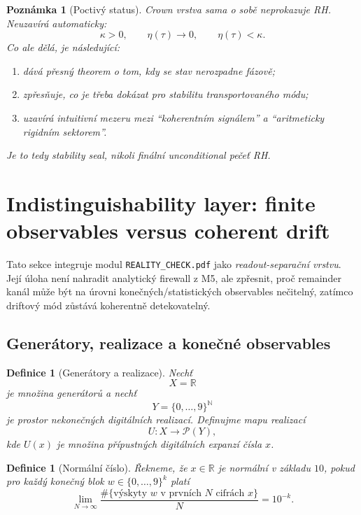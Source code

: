 \documentclass[11pt,a4paper]{article}
\newtheorem{definition}[theorem]{Definice}
\newtheorem{remark}[theorem]{Poznámka}
\begin{document}
\begin{remark}[Poctivý status]
Crown vrstva sama o sobě neprokazuje RH. Neuzavírá automaticky:
\[
\kappa>0,
\qquad
\eta(\tau)\to 0,
\qquad
\eta(\tau)<\kappa.
\]
Co ale dělá, je následující:
\begin{enumerate}
    \item dává přesný theorem o tom, kdy se stav nerozpadne fázově;
    \item zpřesňuje, co je třeba dokázat pro stabilitu transportovaného módu;
    \item uzavírá intuitivní mezeru mezi ``koherentním signálem'' a ``aritmeticky rigidním sektorem''.
\end{enumerate}
Je to tedy \emph{stability seal}, nikoli finální unconditional pečeť RH.
\end{remark}



\section{Indistinguishability layer: finite observables versus coherent drift}

Tato sekce integruje modul \texttt{REALITY\_CHECK.pdf} jako \emph{readout-separační vrstvu}.
Její úloha není nahradit analytický firewall z M5, ale zpřesnit, proč remainder kanál může být
na úrovni konečných/statistických observables nečitelný, zatímco driftový mód zůstává koherentně
detekovatelný.

\subsection*{Generátory, realizace a konečné observables}

\begin{definition}[Generátory a realizace]
Nechť
\[
X=\mathbb{R}
\]
je množina generátorů a nechť
\[
Y=\{0,\dots,9\}^{\mathbb N}
\]
je prostor nekonečných digitálních realizací. Definujme mapu realizací
\[
U:X\to \mathcal P(Y),
\]
kde \(U(x)\) je množina přípustných digitálních expanzí čísla \(x\).
\end{definition}

\begin{definition}[Normální číslo]
Řekneme, že \(x\in\mathbb R\) je normální v základu \(10\), pokud pro každý konečný blok
\(w\in\{0,\dots,9\}^k\) platí
\[
\lim_{N\to\infty}
\frac{\#\{\text{výskyty }w\text{ v prvních }N\text{ cifrách }x\}}{N}
=
10^{-k}.
\]
\end{definition}
\end{document}
